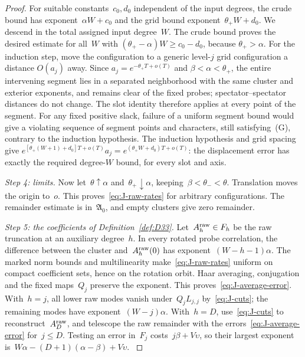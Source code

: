\begin{proof}
For suitable constants~$c_0,d_0$ independent of the input degrees, the crude bound has exponent~$\alpha W+c_0$ and the grid bound exponent~$\theta_+W+d_0$. We descend in the total assigned input degree~$W$. The crude bound proves the desired estimate for all~$W$ with $(\theta_+-\alpha)W\ge c_0-d_0$, because $\theta_+>\alpha$. For the induction step, move the configuration to a generic level-$j$ grid configuration a distance $O(a_j)$ away. Since $a_j=e^{-\theta_+T+o(T)}$ and $\beta<\alpha<\theta_+$, the entire intervening segment lies in a separated neighborhood with the same cluster and exterior exponents, and remains clear of the fixed probes; spectator--spectator distances do not change. The slot identity therefore applies at every point of the segment. For any fixed positive slack, failure of a uniform segment bound would give a violating sequence of segment points and characters, still satisfying~(G), contrary to the induction hypothesis. The induction hypothesis and grid spacing give $e^{[\theta_+(W+1)+d_0]T+o(T)}a_j=e^{(\theta_+W+d_0)T+o(T)}$: the displacement error has exactly the required degree-$W$ bound, for every slot and axis.

\emph{Step 4: limits.} Now let~$\theta\uparrow \alpha$ and~$\theta_+\downarrow \alpha$, keeping~$\beta<\theta_-<\theta$. Translation moves the origin to~$o$. This proves~\eqref{eq:J-raw-rates} for arbitrary configurations. The remainder estimate is in~$\mathfrak A_0$, and empty clusters give zero remainder.

\emph{Step 5: the coefficients of Definition~\ref{def:D33}.} Let~$A^{\rm raw}_h\in F_h$ be the raw truncation at an auxiliary degree~$h$. In every rotated probe correlation, the difference between the cluster and~$A^{\rm raw}_h(0)$ has exponent~$(W-h-1)\alpha$. The marked norm bounds and multilinearity make~\eqref{eq:J-raw-rates} uniform on compact coefficient sets, hence on the rotation orbit. Haar averaging, conjugation and the fixed maps~$Q_j$ preserve the exponent. This proves~\eqref{eq:J-average-error}. With~$h=j$, all lower raw modes vanish under~$Q_jL_{j,j}$ by~\eqref{eq:J-cuts}; the remaining modes have exponent~$(W-j)\alpha$. With~$h=D$, use~\eqref{eq:J-cuts} to reconstruct~$A^{\rm raw}_D$, and telescope the raw remainder with the errors~\eqref{eq:J-average-error} for~$j\le D$. Testing an error in~$F_j$ costs~$j\beta+V\upsilon$, so their largest exponent is~$W\alpha-(D+1)(\alpha-\beta)+V\upsilon$.
\label{proof:J-power-end}
\end{proof}

